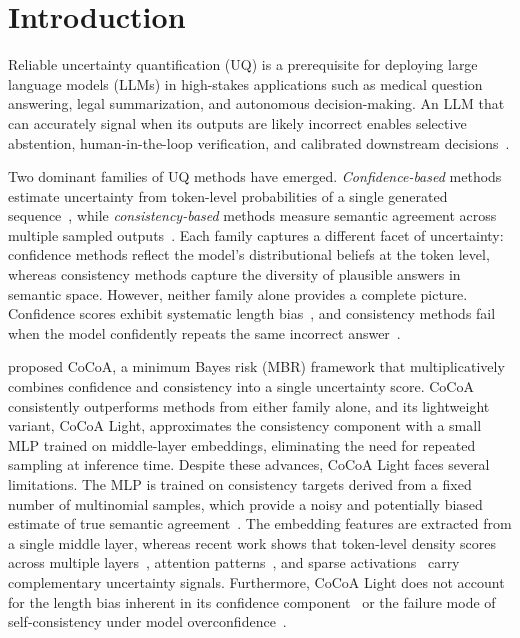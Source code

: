 \section{Introduction}
\label{sec:intro}

Reliable uncertainty quantification (UQ) is a prerequisite for deploying large language models (LLMs) in high-stakes applications such as medical question answering, legal summarization, and autonomous decision-making.
An LLM that can accurately signal when its outputs are likely incorrect enables selective abstention, human-in-the-loop verification, and calibrated downstream decisions~\citep{kadavath2022language,xia2025survey}.

Two dominant families of UQ methods have emerged.
\textit{Confidence-based} methods estimate uncertainty from token-level probabilities of a single generated sequence~\citep{malinin2021uncertainty,fadeeva2024factcheck,duan2024shifting}, while \textit{consistency-based} methods measure semantic agreement across multiple sampled outputs~\citep{kuhn2023semantic,wang2023selfconsistency,lin2024generating,manakul2023selfcheck}.
Each family captures a different facet of uncertainty: confidence methods reflect the model's distributional beliefs at the token level, whereas consistency methods capture the diversity of plausible answers in semantic space.
However, neither family alone provides a complete picture.
Confidence scores exhibit systematic length bias~\citep{vashurin2025line,santilli2025lengthbias}, and consistency methods fail when the model confidently repeats the same incorrect answer~\citep{hamidieh2026crossmodel}.

\citet{cocoa2024} proposed CoCoA, a minimum Bayes risk (MBR) framework that multiplicatively combines confidence and consistency into a single uncertainty score.
CoCoA consistently outperforms methods from either family alone, and its lightweight variant, CoCoA Light, approximates the consistency component with a small MLP trained on middle-layer embeddings, eliminating the need for repeated sampling at inference time.
Despite these advances, CoCoA Light faces several limitations.
The MLP is trained on consistency targets derived from a fixed number of multinomial samples, which provide a noisy and potentially biased estimate of true semantic agreement~\citep{fadeeva2026beams,aichberger2025sdlg}.
The embedding features are extracted from a single middle layer, whereas recent work shows that token-level density scores across multiple layers~\citep{vazhentsev2025satmd}, attention patterns~\citep{vazhentsev2025tad,shelmanov2025uqheads}, and sparse activations~\citep{jiang2025rc} carry complementary uncertainty signals.
Furthermore, CoCoA Light does not account for the length bias inherent in its confidence component~\citep{vashurin2025line} or the failure mode of self-consistency under model overconfidence~\citep{hamidieh2026crossmodel}.

